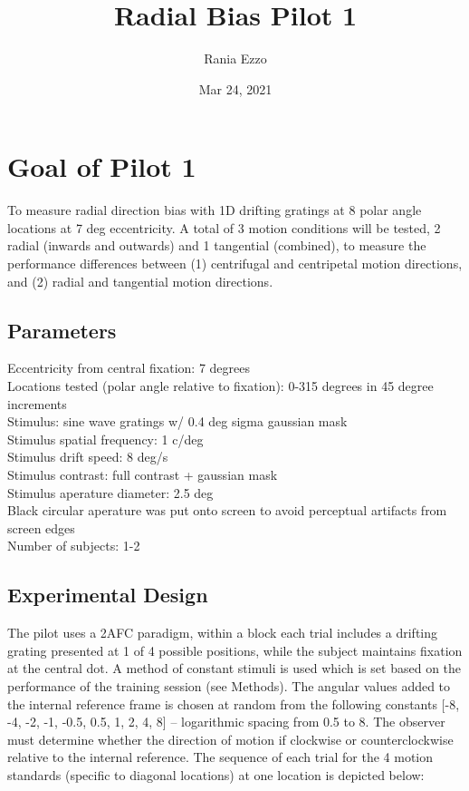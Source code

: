 \documentclass[11pt]{article} %
\title{Radial Bias Pilot 1}
\date{Mar 24, 2021}
\author{Rania Ezzo}
\begin{document}
\maketitle
\tableofcontents


\section{Goal of Pilot 1}
To measure radial direction bias with 1D drifting gratings at 8 polar angle locations at 7 deg eccentricity. A total of 3 motion conditions will be tested, 2 radial (inwards and outwards) and 1 tangential (combined), to measure the performance differences between (1) centrifugal and centripetal motion directions, and (2) radial and tangential motion directions. 

\subsection{Parameters}
Eccentricity from central fixation: 7 degrees
\\
Locations tested (polar angle relative to fixation): 0-315 degrees in 45 degree increments
\\
Stimulus: sine wave gratings w/ 0.4 deg sigma gaussian mask
\\
Stimulus spatial frequency: 1 c/deg
\\
Stimulus drift speed: 8 deg/s
\\
Stimulus contrast: full contrast + gaussian mask
\\
Stimulus aperature diameter: 2.5 deg
\\
Black circular aperature was put onto screen to avoid perceptual artifacts from screen edges
\\
Number of subjects: 1-2

\subsection{Experimental Design}
The pilot uses a 2AFC paradigm, within a block each trial includes a drifting grating presented at 1 of 4 possible positions, while the subject maintains fixation at the central dot. A method of constant stimuli is used which is set based on the performance of the training session (see Methods). The angular values added to the internal reference frame is chosen at random from the following constants [-8, -4, -2, -1, -0.5, 0.5, 1, 2, 4, 8] -- logarithmic spacing from 0.5 to 8. The observer must determine whether the direction of motion if clockwise or counterclockwise relative to the internal reference. The sequence of each trial for the 4 motion standards (specific to diagonal locations) at one location is depicted below:
\end{document}
